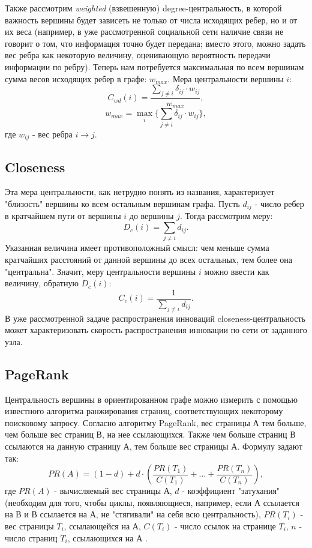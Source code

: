 	Также рассмотрим \textit{weighted} (взвешенную) degree-центральность, в которой важность вершины будет зависеть не только от числа исходящих ребер, но и от их веса (например, в уже рассмотренной социальной сети наличие связи не говорит о том, что информация точно будет передана; вместо этого, можно задать вес ребра как некоторую величину, оценивающую вероятность передачи информации по ребру). Теперь нам потребуется максимальная по всем вершинам сумма весов исходящих ребер в графе: $w_{max}$. Мера центральности вершины $i$:
	\begin{equation}
	C_{wd}(i) = \frac{\sum_{j\neq i} \delta_{ij}\cdot w_{ij}}{w_{max}},
	\end{equation}
	\begin{equation}
	w_{max} = \max_i\{\sum_{j\neq i}\delta_{ij}\cdot w_{ij}\},
	\end{equation}
	где $w_{ij}$ - вес ребра $i \rightarrow j$.
	
	\subsection{Closeness}
	Эта мера центральности, как нетрудно понять из названия, характеризует "близость" вершины ко всем остальным вершинам графа. Пусть $d_{ij}$ - число ребер в кратчайшем пути от вершины $i$ до вершины $j$. Тогда рассмотрим меру:
	\begin{equation}
	D_c(i)=\sum_{j\neq i} d_{ij}.
	\end{equation}
	Указанная величина имеет противоположный смысл: чем меньше сумма кратчайших расстояний от данной вершины до всех остальных, тем более она "центральна". Значит, меру центральности вершины $i$ можно ввести как величину, обратную $D_c(i)$:
	\begin{equation}
	C_c(i) = \frac{1}{\sum_{j\neq i} d_{ij}}.
	\end{equation}
	В уже рассмотренной задаче распространения инноваций closeness-центральность может характеризовать скорость распространения инновации по сети от заданного узла.
	
	\subsection{PageRank \cite{pagerankcent}}
	Центральность вершины в ориентированном графе можно измерить с помощью известного алгоритма ранжирования страниц, соответствующих некоторому поисковому запросу. Согласно алгоритму PageRank, вес страницы А тем больше, чем больше вес страниц В, на нее ссылающихся. Также чем больше страниц В ссылаются на данную страницу А, тем больше вес страницы А. Формулу задают так:
	\begin{equation}
	PR(A)=(1-d)+d\cdot (\frac{PR(T_1)}{C(T_1)}+\dots+\frac{PR(T_n)}{C(T_n)}),
	\end{equation}
	где $PR(A)$ - вычисляемый вес страницы А, $d$ - коэффициент "затухания" (необходим для того, чтобы циклы, появляющиеся, например, если А ссылается на В и В ссылается на А, не "стягивали" на себя всю центральность), $PR(T_i)$ - вес страницы $T_i$, ссылающейся на А, $C(T_i)$ - число ссылок на странице $T_i$, $n$ - число страниц $T_i$, ссылающихся на А \cite{pagerank}.
	

